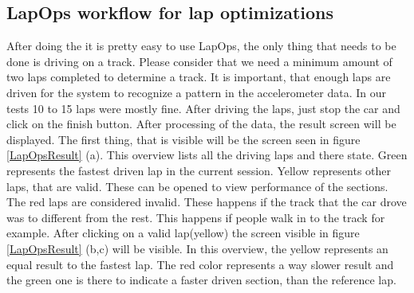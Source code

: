 \subsection{LapOps workflow for lap optimizations}
After doing the  it is pretty easy to use LapOps, the only thing that needs to be done is driving on a track. Please consider that we need a minimum amount of two laps completed to determine a track. It is important, that enough laps are driven for the system to recognize a pattern in the accelerometer data. In our tests 10 to 15 laps were mostly fine. After driving the laps, just stop the car and click on the finish button. After processing of the data, the result screen will be displayed. The first thing, that is visible will be the screen seen in figure \ref{LapOpsResult} (a). This overview lists all the driving laps and there state. Green represents the fastest driven lap in the current session. Yellow represents other laps, that are valid. These can be opened to view performance of the sections. The red laps are considered invalid. These happens if the track that the car drove was to different from the rest. This happens if people walk in to the track for example. After clicking on a valid lap(yellow) the screen visible in figure \ref{LapOpsResult} (b,c) will be visible. In this overview, the yellow represents an equal result to the fastest lap. The red color represents a way slower result and the green one is there to indicate a faster driven section, than the reference lap.
